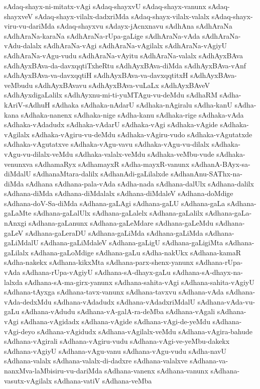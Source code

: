 {sAdaq-shayx-ni-mitatx-vAgi
sAdaq-shayxvU
sAdaq-shayx-vanunx
sAdaq-shayxveV
sAdaq-shayx-vilalx-dadxriMda
sAdaq-shayx-vilalx-valalx
sAdaq-shayx-viru-vu-dariMda
sAdaq-shayxvu
sAdayx-jAcnxnavu
sAdhAna
sAdhAraNa
sAdhAraNa-karaNa
sAdhAraNa-rUpa-gaLige
sAdhAraNa-vAda
sAdhAraNa-vAdu-dalalx
sAdhAraNa-vAgi
sAdhAraNa-vAgilalx
sAdhAraNa-vAgiyU
sAdhAraNa-vAgu-vudu
sAdhAraNa-vAyitu
sAdhAraNa-valalx
sAdhAyxBAva
sAdhAyxBAva-da-davxqqtiTxheRtu
sAdhAyxBAva-diMda
sAdhAyxBAva-vAnf
sAdhAyxBAva-va-davxqqtiH
sAdhAyxBAva-va-davxqqtitxH
sAdhAyxBAva-veMbudu
sAdhAyxBAvavu
sAdhAyxBAva-vuLaLx
sAdhAyxBAveV
sAdhAyxdigaLalilx
sAdhAyxnu-mi-ti-yuMTAgu-vu-deMdu
sAdhaRM
sAdha-kAriV-sAdhuH
sAdhaka
sAdhaka-nAdarU
sAdhaka-nAgiralu
sAdha-kanU
sAdha-kana
sAdhaka-nanenx
sAdhaka-nige
sAdha-kanu
sAdhaka-rige
sAdhaka-vAda
sAdhaka-vAdadudx
sAdhaka-vAdarU
sAdhaka-vAgi
sAdhaka-vAgide
sAdhaka-vAgilalx
sAdhaka-vAgiru-vu-deMdu
sAdhaka-vAgiru-vudo
sAdhaka-vAgutatxde
sAdhaka-vAgutatxve
sAdhaka-vAgu-vavu
sAdhaka-vAgu-vu-dilalx
sAdhaka-vAgu-vu-dilalx-veMdu
sAdhaka-valalx-veMdu
sAdhaka-veMbu-vude
sAdhaka-venunxva
sAdhamaRyx
sAdhamayxR
sAdha-mayxR-vanunx
sAdhanA-BAyx-sa-diMdalU
sAdhanaMtara-dalilx
sAdhanAdi-gaLilalxde
sAdhanAnu-SAThx-na-diMda
sAdhana
sAdhana-pala-vAda
sAdha-nada
sAdhana-dalUlx
sAdhana-dalilx
sAdhana-diMda
sAdhana-diMdalalx
sAdhana-diMdaleV
sAdhana-doMdige
sAdhana-doV-Sa-diMda
sAdhana-gaLAgi
sAdhana-gaLU
sAdhana-gaLa
sAdhana-gaLaMte
sAdhana-gaLalUlx
sAdhana-gaLalelx
sAdhana-gaLalilx
sAdhana-gaLa-nAnxgi
sAdhana-gaLanunx
sAdhana-gaLeMdare
sAdhana-gaLeMdu
sAdhana-gaLeV
sAdhana-gaLeraDU
sAdhana-gaLiMda
sAdhana-gaLiMda
sAdhana-gaLiMdalU
sAdhana-gaLiMdaleV
sAdhana-gaLigU
sAdhana-gaLigiMta
sAdhana-gaLilalx
sAdhana-gaLoMdige
sAdhana-gaLu
sAdha-nakUkx
sAdhana-kamaR
sAdha-nakekx
sAdhana-kikxMta
sAdhana-parx-shenx-yanunx
sAdhana-rUpa-vAda
sAdhana-rUpa-vAgiyU
sAdhana-sA-dhayx-gaLu
sAdhana-sA-dhayx-na-lalxda
sAdhana-sA-ma-girx-yanunx
sAdhana-sahita-vAgi
sAdhana-sahita-vAgiyU
sAdhana-tAyxga
sAdhana-tavx-vanunx
sAdhana-tavxvu
sAdhana-vAda
sAdhana-vAda-dedxMdu
sAdhana-vAdadudx
sAdhana-vAdadxriMdalU
sAdhana-vAda-vu-gaLu
sAdhana-vAdudu
sAdhana-vA-galA-ra-deMba
sAdhana-vAgali
sAdhana-vAgi
sAdhana-vAgidadx
sAdhana-vAgide
sAdhana-vAgi-de-yeMdu
sAdhana-vAgi-deyo
sAdhana-vAgidudx
sAdhana-vAgilalx-veMdu
sAdhana-vAgira-bahude
sAdhana-vAgirali
sAdhana-vAgiru-vudu
sAdhana-vAgi-ve-yeMbu-dakekx
sAdhana-vAgiyU
sAdhana-vAgu-vanu
sAdhana-vAgu-vudu
sAdha-navU
sAdhana-valalx
sAdhana-valalx-di-dadxre
sAdhana-valalxve
sAdhana-va-nanxMva-laMbisiru-vu-dariMda
sAdhana-vanenx
sAdhana-vanunx
sAdhana-vasutx-vAgilalx
sAdhana-vatiV
sAdhana-veMba
}
